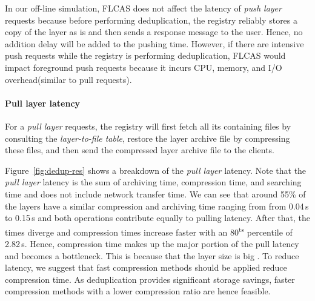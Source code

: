 In our off-line simulation,
FLCAS does not affect the latency of \emph{push layer} requests
because before performing deduplication, the registry reliably stores
a copy of the layer as is and then sends a response message to the user.
%
Hence, no addition delay will be added to the pushing time. 
%
However, 
if there are intensive push requests while the registry is performing deduplication,
FLCAS would impact foreground push requests because it incurs 
CPU, memory, and I/O overhead(similar to pull requests).

\paragraph{Pull layer latency} 

For a \emph{pull layer} requests, the registry will first fetch 
all its containing files by consulting the \emph{layer-to-file table}, 
restore the layer archive file by compressing these files, and
then send the compressed layer archive file to the clients.

Figure~\ref{fig:dedup-res} shows a breakdown of the \emph{pull layer}
latency.
%
Note that the \emph{pull layer} latency is the sum of archiving time,
compression time, and searching time and does not include network transfer
time. 
%
We can see that around 55\% of the layers have a similar compression and archiving
time ranging from from 0.04\,s to 0.15\,s and both operations contribute equally
to pulling latency.
%
%
After that, the times diverge and compression times increase faster with an
80\textsuperscript{ts} percentile of 2.82\,s. Hence, compression time makes
up the major portion of the pull latency and becomes a bottleneck.
This is because that the layer size is big
.
%
%
To reduce latency, we suggest that fast compression methods should be applied reduce
compression time. As deduplication provides significant storage savings, faster compression
methods with a lower compression ratio are hence feasible.

